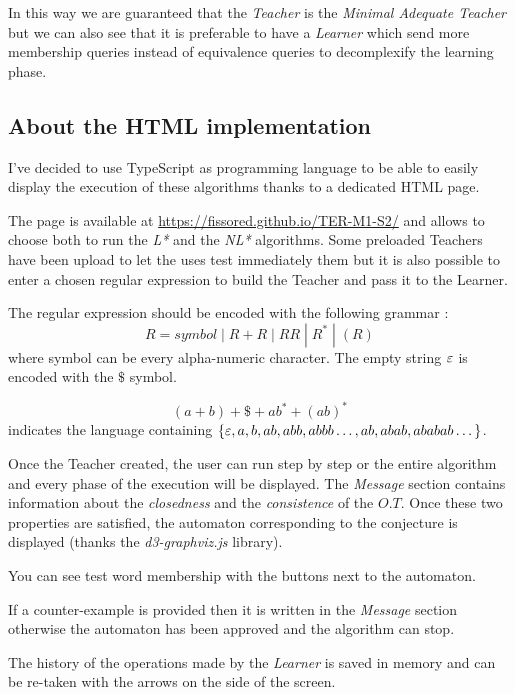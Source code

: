 In this way we are guaranteed that the \textit{Teacher} is the \textit{Minimal Adequate Teacher} but we can also see that it is preferable to have a \textit{Learner} which send more membership queries instead of equivalence queries to decomplexify the learning phase.

\subsection{About the HTML implementation}

I've decided to use TypeScript as programming language to be able to easily display the execution of these algorithms thanks to a dedicated HTML page.

The page is available at \url{https://fissored.github.io/TER-M1-S2/} and allows to choose both to run the \textit{L*} and the \textit{NL*} algorithms. Some preloaded Teachers have been upload to let the uses test immediately them but it is also possible to enter a chosen regular expression to build the Teacher and pass it to the Learner.

The regular expression should be encoded with the following grammar :
\[ R = symbol \; | \; R + R \; | \; RR \; | \;R^* \; | \;(R) \]
where symbol can be every alpha-numeric character. The empty string $\varepsilon$ is encoded with the $\$$ symbol.

\begin{example}
  \[(a + b)+\$+ab^*+(ab)^*\] indicates the language containing $\{\varepsilon,a, b,  ab, abb, abbb\dots, ab, abab, ababab\dots\}$.
\end{example}

Once the Teacher created, the user can run step by step or the entire algorithm and every phase of the execution will be displayed. The \textit{Message} section contains information about the \textit{closedness} and the \textit{consistence} of the $O.T$. Once these two properties are satisfied, the automaton corresponding to the conjecture is displayed (thanks the \textit{d3-graphviz.js} library).

You can see test word membership with the buttons next to the automaton.

If a counter-example is provided then it is written in the \textit{Message} section otherwise the automaton has been approved and the algorithm can stop.

The history of the operations made by the \textit{Learner} is saved in memory and can be re-taken with the arrows on the side of the screen.

